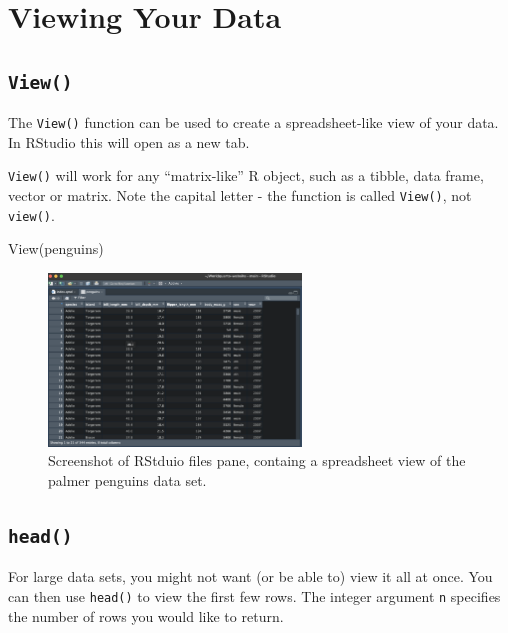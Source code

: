 \documentclass[
  12pt,
]{book}
\newenvironment{Shaded}{\begin{snugshade}}{\end{snugshade}}
\newcommand{\FunctionTok}[1]{\textcolor[rgb]{0.00,0.00,0.00}{#1}}
\newcommand{\NormalTok}[1]{#1}
\begin{document}
\hypertarget{viewing-your-data}{%
\section{Viewing Your Data}\label{viewing-your-data}}

\hypertarget{view}{%
\subsection{\texorpdfstring{\texttt{View()}}{View()}}\label{view}}

The \texttt{View()} function can be used to create a spreadsheet-like view of your data. In RStudio this will open as a new tab.

\texttt{View()} will work for any ``matrix-like'' R object, such as a tibble, data frame, vector or matrix. Note the capital letter - the function is called \texttt{View()}, not \texttt{view()}.

\begin{Shaded}
\begin{Highlighting}[]
\FunctionTok{View}\NormalTok{(penguins)}
\end{Highlighting}
\end{Shaded}

\begin{figure}
\centering
\includegraphics[width=0.6\textwidth,height=\textheight]{images/301-edav-wrangling/view-penguins-screenshot.png}
\caption{Screenshot of RStduio files pane, containg a spreadsheet view of the palmer penguins data set.}
\end{figure}

\hypertarget{head}{%
\subsection{\texorpdfstring{\texttt{head()}}{head()}}\label{head}}

For large data sets, you might not want (or be able to) view it all at once. You can then use \texttt{head()} to view the first few rows. The integer argument \texttt{n} specifies the number of rows you would like to return.
\end{document}
